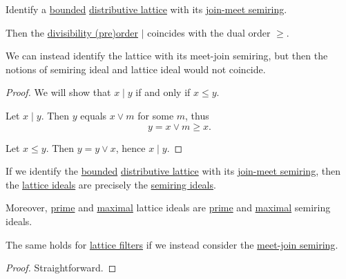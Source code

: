 \begin{proposition}\label{thm:lattice_divisibility}
  Identify a \hyperref[def:extremal_points/bounds]{bounded} \hyperref[def:distributive_lattice]{distributive lattice} with its \hyperref[ex:def:semiring/lattice]{join-meet semiring}.

  Then the \hyperref[thm:semiring_divisibility_order]{divisibility (pre)order} \( \mid \) coincides with the dual order \( \geq \).
\end{proposition}
\begin{comments}
  \item We can instead identify the lattice with its meet-join semiring, but then the notions of semiring ideal and lattice ideal would not coincide.
\end{comments}
\begin{proof}
  We will show that \( x \mid y \) if and only if \( x \leq y \).

  \SufficiencySubProof Let \( x \mid y \). Then \( y \) equals \( x \vee m \) for some \( m \), thus
  \begin{equation*}
    y = x \vee m \geq x.
  \end{equation*}

  \NecessitySubProof Let \( x \leq y \). Then \( y = y \vee x \), hence \( x \mid y \).
\end{proof}

\begin{proposition}\label{thm:lattice_ideal_as_semiring_ideal}
  If we identify the \hyperref[def:extremal_points/bounds]{bounded} \hyperref[def:distributive_lattice]{distributive lattice} with its \hyperref[ex:def:semiring/lattice]{join-meet semiring}, then the \hyperref[def:lattice_ideal]{lattice ideals} are precisely the \hyperref[def:semiring_ideal]{semiring ideals}.

  Moreover, \hyperref[def:lattice_ideal/prime]{prime} and \hyperref[def:lattice_ideal/maximal]{maximal} lattice ideals are \hyperref[def:semiring_ideal/prime]{prime} and \hyperref[def:semiring_ideal/maximal]{maximal} semiring ideals.
\end{proposition}
\begin{comments}
  \item The same holds for \hyperref[def:lattice_ideal]{lattice filters} if we instead consider the \hyperref[ex:def:semiring/lattice]{meet-join semiring}.
\end{comments}
\begin{proof}
  Straightforward.
\end{proof}

